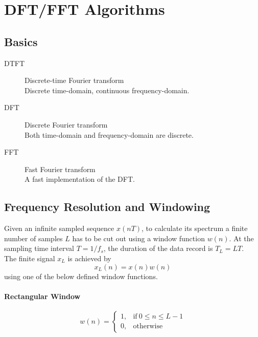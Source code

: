 \section{DFT/FFT Algorithms}

\subsection{Basics}

\begin{description}
	\item[DTFT] Discrete-time Fourier transform \\
		Discrete time-domain, continuous frequency-domain.
	\item[DFT] Discrete Fourier transform \\
		Both time-domain and frequency-domain are discrete.
	\item[FFT] Fast Fourier transform \\
		A fast implementation of the DFT.
\end{description}

\subsection{Frequency Resolution and Windowing}

Given an infinite sampled sequence $x(nT)$, to calculate its spectrum a finite
number of samples $L$ has to be cut out using a window function $w(n)$. 
At the sampling time interval $T = 1/f_s$, the duration of the data record 
is $T_L = LT$. \\

The finite signal $x_L$ is achieved by
\begin{equation*}
	x_L(n) = x(n) w(n)
\end{equation*}
using one of the below defined window functions. \\

\paragraph{Rectangular Window}
	\begin{equation*}
		w(n) = \begin{cases}
			1, & \text{if} \: 0 \leq n \leq L-1 \\
			0, & \text{otherwise}
		\end{cases}
	\end{equation*}	


